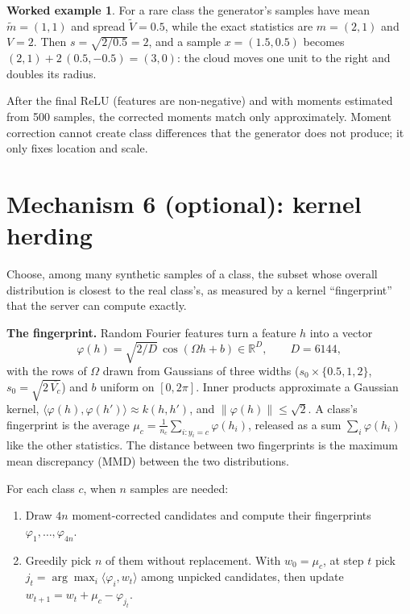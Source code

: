 \documentclass[11pt]{article}
\theoremstyle{plain}
\theoremstyle{definition}
\newtheorem{example}{Worked example}
\newcommand{\R}{\mathbb{R}}
\newcommand{\norm}[1]{\lVert #1\rVert}
\begin{document}
\begin{example}
For a rare class the generator's samples have mean $\tilde m=(1,1)$ and spread $\tilde V=0.5$, while the exact
statistics are $m=(2,1)$ and $V=2$. Then $s=\sqrt{2/0.5}=2$, and a sample $x=(1.5,0.5)$ becomes
$(2,1)+2\,(0.5,-0.5)=(3,0)$: the cloud moves one unit to the right and doubles its radius.
\end{example}

\begin{caveat}
After the final ReLU (features are non-negative) and with moments estimated from 500 samples, the corrected
moments match only approximately. Moment correction cannot create class differences that the generator does not
produce; it only fixes location and scale.
\end{caveat}

\section{Mechanism 6 (optional): kernel herding}\label{sec:kh}

\begin{purpose}
Choose, among many synthetic samples of a class, the subset whose overall distribution is closest to the real class's,
as measured by a kernel ``fingerprint'' that the server can compute exactly.
\end{purpose}

\textbf{The fingerprint.} Random Fourier features turn a feature $h$ into a vector
\[
\varphi(h)=\sqrt{2/D}\,\cos(\Omega h+b)\in\R^{D},\qquad D=6144,
\]
with the rows of $\Omega$ drawn from Gaussians of three widths ($s_0\times\{0.5,1,2\}$, $s_0=\sqrt{2\,\overline{V_c}}$)
and $b$ uniform on $[0,2\pi]$. Inner products approximate a Gaussian kernel,
$\langle\varphi(h),\varphi(h')\rangle\approx k(h,h')$, and $\norm{\varphi(h)}\le\sqrt2$. A class's fingerprint is the
average $\mu_c=\frac1{n_c}\sum_{i:y_i=c}\varphi(h_i)$, released as a sum $\sum_i\varphi(h_i)$ like the other statistics.
The distance between two fingerprints is the maximum mean discrepancy (MMD) between the two distributions.

\begin{steps}
For each class $c$, when $n$ samples are needed:
\begin{enumerate}
\item Draw $4n$ moment-corrected candidates and compute their fingerprints $\varphi_1,\dots,\varphi_{4n}$.
\item Greedily pick $n$ of them without replacement. With $w_0=\mu_c$, at step $t$ pick
$j_t=\arg\max_i\langle\varphi_i,w_t\rangle$ among unpicked candidates, then update $w_{t+1}=w_t+\mu_c-\varphi_{j_t}$.
\end{enumerate}
\end{steps}
\end{document}
